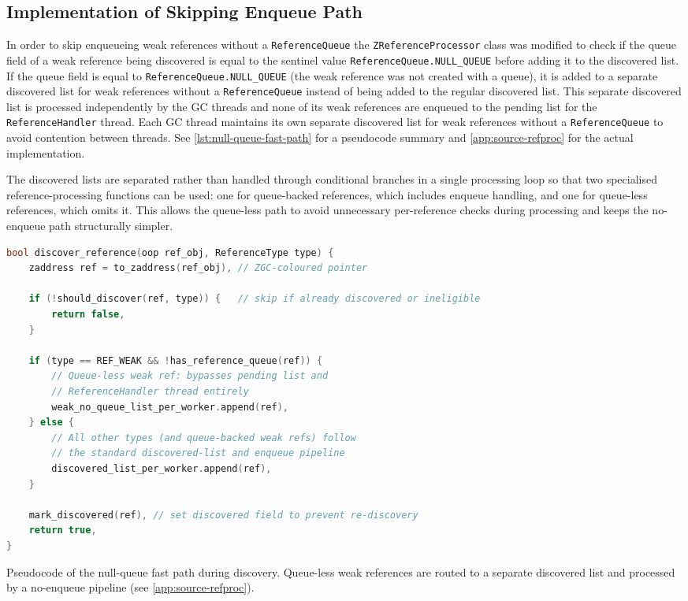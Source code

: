 \subsection{Implementation of Skipping Enqueue Path}
\label{subsec:di-sep-impl}
In order to skip enqueueing weak references without a \texttt{ReferenceQueue} the \texttt{ZReferenceProcessor} class was modified to check if the queue field of a weak reference being discovered is equal to the sentinel value \texttt{ReferenceQueue.NULL\_QUEUE} before adding it to the discovered list. If the queue field is equal to \texttt{ReferenceQueue.NULL\_QUEUE} (the weak reference was not created with a queue), it is added to a separate discovered list for weak references without a \texttt{ReferenceQueue} instead of being added to the regular discovered list. This separate discovered list is processed independently by the \ac{GC} threads and none of its weak references are enqueued to the pending list for the \texttt{ReferenceHandler} thread. Each \ac{GC} thread maintains its own separate discovered list for weak references without a \texttt{ReferenceQueue} to avoid contention between threads. See \cref{lst:null-queue-fast-path} for a pseudocode summary and \cref{app:source-refproc} for the actual implementation.

The discovered lists are separated rather than handled through conditional branches in a single processing loop so that two specialised reference-processing functions can be used: one for queue-backed references, which includes enqueue handling, and one for queue-less references, which omits it. This allows the queue-less path to avoid unnecessary per-reference checks during processing and keeps the no-enqueue path structurally simpler.

\begin{listing}[t]
\begin{lstlisting}[language=C++]
bool discover_reference(oop ref_obj, ReferenceType type) {
    zaddress ref = to_zaddress(ref_obj), // ZGC-coloured pointer

    if (!should_discover(ref, type)) {   // skip if already discovered or ineligible
        return false,
    }

    if (type == REF_WEAK && !has_reference_queue(ref)) {
        // Queue-less weak ref: bypasses pending list and
        // ReferenceHandler thread entirely
        weak_no_queue_list_per_worker.append(ref),
    } else {
        // All other types (and queue-backed weak refs) follow
        // the standard discovered-list and enqueue pipeline
        discovered_list_per_worker.append(ref),
    }

    mark_discovered(ref), // set discovered field to prevent re-discovery
    return true,
}
\end{lstlisting}
\caption[Queue-less weak discovery split]{Pseudocode of the null-queue fast path during discovery. Queue-less weak references are routed to a separate discovered list and processed by a no-enqueue pipeline (see \cref{app:source-refproc}).}
\label{lst:null-queue-fast-path}
\end{listing}

